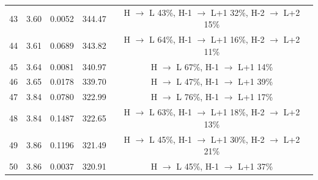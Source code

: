 \begin{table}[H]
{\begin{center}
\begin{tabular}{ccccc}
43 & 3.60 & 0.0052 & 344.47 & H $\rightarrow$ L 43\%, H-1 $\rightarrow$ L+1 32\%, H-2 $\rightarrow$ L+2 15\% \\
44 & 3.61 & 0.0689 & 343.82 & H $\rightarrow$ L 64\%, H-1 $\rightarrow$ L+1 16\%, H-2 $\rightarrow$ L+2 11\% \\
45 & 3.64 & 0.0081 & 340.97 & H $\rightarrow$ L 67\%, H-1 $\rightarrow$ L+1 14\% \\
46 & 3.65 & 0.0178 & 339.70 & H $\rightarrow$ L 47\%, H-1 $\rightarrow$ L+1 39\% \\
47 & 3.84 & 0.0780 & 322.99 & H $\rightarrow$ L 76\%, H-1 $\rightarrow$ L+1 17\% \\
48 & 3.84 & 0.1487 & 322.65 & H $\rightarrow$ L 63\%, H-1 $\rightarrow$ L+1 18\%, H-2 $\rightarrow$ L+2 13\% \\
49 & 3.86 & 0.1196 & 321.49 & H $\rightarrow$ L 45\%, H-1 $\rightarrow$ L+1 30\%, H-2 $\rightarrow$ L+2 21\% \\
50 & 3.86 & 0.0037 & 320.91 & H $\rightarrow$ L 45\%, H-1 $\rightarrow$ L+1 37\% \\
\hline
\end{tabular}
\end{center} }
\vspace{-0.2cm}
\end{table} \newpage 
